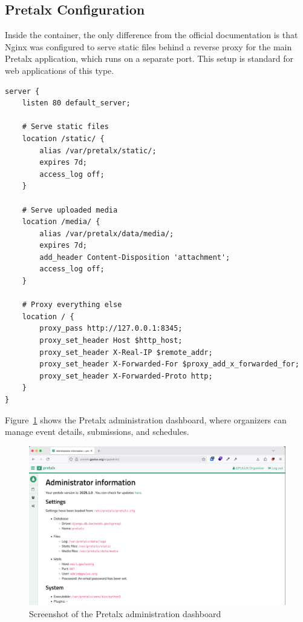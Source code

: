 \subsection*{Pretalx Configuration}

Inside the container, the only difference from the official documentation is that Nginx was configured to serve static files behind a reverse proxy for the main Pretalx application, which runs on a separate port. This setup is standard for web applications of this type.

\begin{lstlisting}[caption={Nginx configuration used by Pretalx to proxy the application and serve static files}]
server {
    listen 80 default_server;

    # Serve static files
    location /static/ {
        alias /var/pretalx/static/;
        expires 7d;
        access_log off;
    }

    # Serve uploaded media
    location /media/ {
        alias /var/pretalx/data/media/;
        expires 7d;
        add_header Content-Disposition 'attachment';
        access_log off;
    }

    # Proxy everything else
    location / {
        proxy_pass http://127.0.0.1:8345;
        proxy_set_header Host $http_host;
        proxy_set_header X-Real-IP $remote_addr;
        proxy_set_header X-Forwarded-For $proxy_add_x_forwarded_for;
        proxy_set_header X-Forwarded-Proto http;
    }
}
\end{lstlisting}

Figure~\ref{fig:pretalx-admin} shows the Pretalx administration dashboard, where organizers can manage event details, submissions, and schedules.

\begin{figure}[h!]
	\centering
	\includegraphics[width=\textwidth]{imaxes/pretalx-admin.png}
       \caption{Screenshot of the Pretalx administration dashboard}
	\label{fig:pretalx-admin}
\end{figure}

